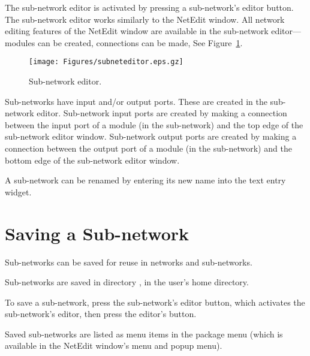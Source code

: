 \newcommand{\subneteditorfig}{%
  \centerline{\texttt{[image: Figures/subneteditor.eps.gz]}}
}
\begin{htmlonly}
  \newcommand{\subneteditorfig}{%
    \htmladdimg[alt="Sub-net editor"]{../Figures/subneteditor.gif}
  }
\end{htmlonly}

The sub-network editor is activated by pressing a sub-network's editor
button.  The sub-network editor works similarly to the NetEdit window.
All network editing features of the NetEdit window are available in
the sub-network editor---modules can be created, connections can be
made, \etc{} See Figure~\ref{fig:subneteditor}.

\begin{figure}[htb]
  \centering
  \begin{makeimage} \end{makeimage}
  \subneteditorfig
  \caption{\label{fig:subneteditor} Sub-network editor.}
\end{figure}

Sub-networks have input and/or output ports.  These are created in the
sub-network editor.  Sub-network input ports are created by making a
connection between the input port of a module (in the sub-network) and
the top edge of the sub-network editor window.  Sub-network output
ports are created by making a connection between the output port of a
module (in the sub-network) and the bottom edge of the sub-network
editor window.

A sub-network can be renamed by entering its new name into the
 text entry widget.

\section{Saving a Sub-network}
\label{sec:savesubnet}

Sub-networks can be saved for reuse in networks and sub-networks.

Sub-networks are saved in directory , in the
user's home directory.

To save a sub-network, press the sub-network's editor
button, which activates the sub-network's editor, then press the
editor's  button.

Saved sub-networks are listed as menu items in the 
package menu (which is available in the NetEdit window's 
menu and popup menu).

